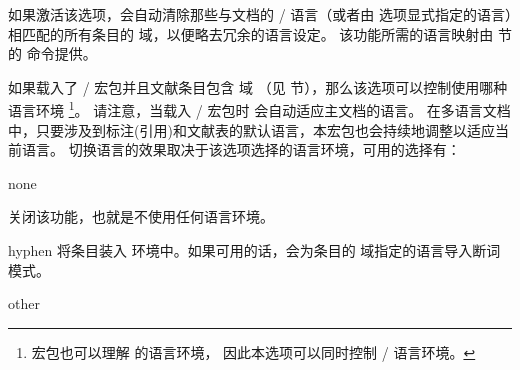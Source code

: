 \begin{optionlist}
如果激活该选项，\biblatex 会自动清除那些与文档的 / 语言（或者由  选项显式指定的语言）相匹配的所有条目的  域，以便略去冗余的语言设定。
该功能所需的语言映射由  节的  命令提供。


如果载入了 / 宏包并且文献条目包含  域
（见  节），那么该选项可以控制使用哪种  语言环境
\footnote{	 宏包也可以理解  的语言环境，	因此本选项可以同时控制 / 语言环境。}。
请注意，当载入 / 宏包时 \biblatex 会自动适应主文档的语言。
在多语言文档中，只要涉及到标注(引用)和文献表的默认语言，本宏包也会持续地调整以适应当前语言。
切换语言的效果取决于该选项选择的语言环境，可用的选择有：

\begin{valuelist}

\item[none]

关闭该功能，也就是不使用任何语言环境。

\item[hyphen]
将条目装入   环境中。如果可用的话，会为条目的  域指定的语言导入断词模式。

\item[other]


\end{valuelist}
\end{optionlist}
